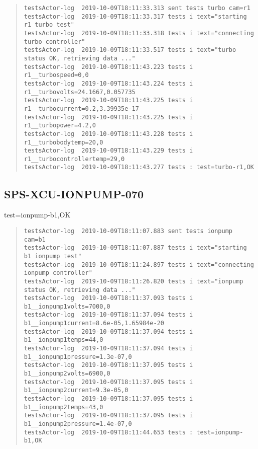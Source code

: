 \begin{quote}
\begin{tiny}
\begin{verbatim}
testsActor-log  2019-10-09T18:11:33.313 sent tests turbo cam=r1
testsActor-log  2019-10-09T18:11:33.317 tests i text="starting r1 turbo test"
testsActor-log  2019-10-09T18:11:33.318 tests i text="connecting turbo controller"
testsActor-log  2019-10-09T18:11:33.517 tests i text="turbo status OK, retrieving data ..."
testsActor-log  2019-10-09T18:11:43.223 tests i r1__turbospeed=0,0
testsActor-log  2019-10-09T18:11:43.224 tests i r1__turbovolts=24.1667,0.057735
testsActor-log  2019-10-09T18:11:43.225 tests i r1__turbocurrent=0.2,3.39935e-17
testsActor-log  2019-10-09T18:11:43.225 tests i r1__turbopower=4.2,0
testsActor-log  2019-10-09T18:11:43.228 tests i r1__turbobodytemp=20,0
testsActor-log  2019-10-09T18:11:43.229 tests i r1__turbocontrollertemp=29,0
testsActor-log  2019-10-09T18:11:43.277 tests : test=turbo-r1,OK
\end{verbatim}
\end{tiny}
\end{quote}

\subsection{SPS-XCU-IONPUMP-070}
\label{sec:tc-070}

test=ionpump-b1,OK

\begin{quote}
\begin{tiny}
\begin{verbatim}
testsActor-log  2019-10-09T18:11:07.883 sent tests ionpump cam=b1
testsActor-log  2019-10-09T18:11:07.887 tests i text="starting b1 ionpump test"
testsActor-log  2019-10-09T18:11:24.897 tests i text="connecting ionpump controller"
testsActor-log  2019-10-09T18:11:26.820 tests i text="ionpump status OK, retrieving data ..."
testsActor-log  2019-10-09T18:11:37.093 tests i b1__ionpump1volts=7000,0
testsActor-log  2019-10-09T18:11:37.094 tests i b1__ionpump1current=8.6e-05,1.65984e-20
testsActor-log  2019-10-09T18:11:37.094 tests i b1__ionpump1temps=44,0
testsActor-log  2019-10-09T18:11:37.094 tests i b1__ionpump1pressure=1.3e-07,0
testsActor-log  2019-10-09T18:11:37.095 tests i b1__ionpump2volts=6900,0
testsActor-log  2019-10-09T18:11:37.095 tests i b1__ionpump2current=9.3e-05,0
testsActor-log  2019-10-09T18:11:37.095 tests i b1__ionpump2temps=43,0
testsActor-log  2019-10-09T18:11:37.095 tests i b1__ionpump2pressure=1.4e-07,0
testsActor-log  2019-10-09T18:11:44.653 tests : test=ionpump-b1,OK
\end{verbatim}
\end{tiny}
\end{quote}

